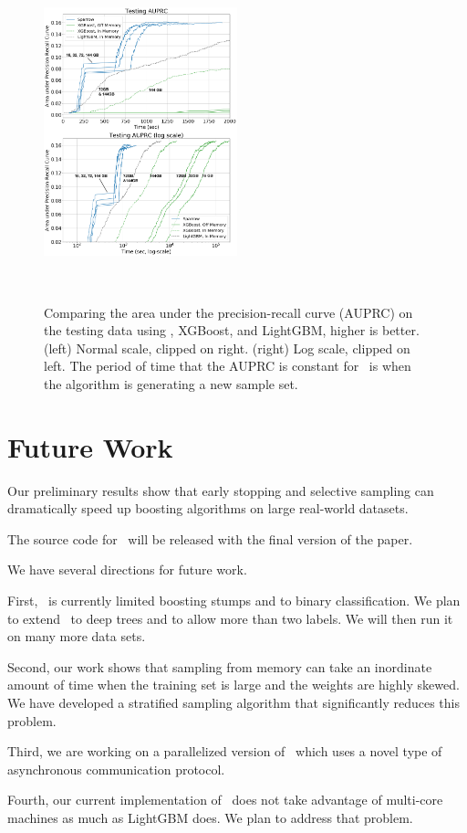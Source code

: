 \begin{figure}[t]
    \centering
    \includegraphics[width=0.5\textwidth]{figs/splice-auprc2m.png}
    \caption{Comparing the area under the precision-recall curve (AUPRC) on the testing data
    using \Sparrow, XGBoost, and LightGBM, higher is better.
    (left) Normal scale, clipped on right.
    (right) Log scale, clipped on left.
    The period of time that the AUPRC is constant for \Sparrow\ is when the algorithm is generating a new sample set.}~\label{fig:auprc}
\end{figure}


\section{Future Work}\label{sec:Conclusion}
Our preliminary results show that early stopping and selective
sampling can dramatically speed up boosting algorithms on large
real-world datasets.

The source code for \Sparrow\ will be released with the
final version of the paper.

We have several directions for future work.

First, \Sparrow\ is currently limited boosting stumps and to binary
classification. We plan to extend \Sparrow\ to deep trees and to allow
more than two labels. We will then run it on many more data sets.

Second, our work shows that sampling from memory can take an
inordinate amount of time when the training set is large and the
weights are highly skewed. We have developed a stratified sampling
algorithm that significantly reduces this problem.

Third, we are working on a parallelized version of \Sparrow\ which
uses a  novel type of asynchronous communication protocol.

Fourth, our current implementation of \Sparrow\ does not take
advantage of multi-core machines as much as LightGBM does. We plan to
address that problem.




